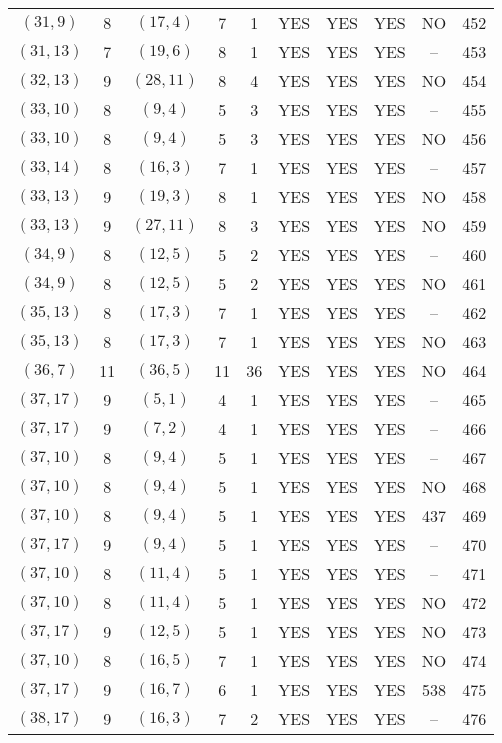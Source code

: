 \begin{longtable}{|c|c|c|c|c|c|c|c|c|c|}
$(31, 9)$ & 8 & $(17, 4)$ & 7 & 1 & YES & YES & YES & NO & 452\\
$(31, 13)$ & 7 & $(19, 6)$ & 8 & 1 & YES & YES & YES & -- & 453\\
$(32, 13)$ & 9 & $(28, 11)$ & 8 & 4 & YES & YES & YES & NO & 454\\
$(33, 10)$ & 8 & $(9, 4)$ & 5 & 3 & YES & YES & YES & -- & 455\\
$(33, 10)$ & 8 & $(9, 4)$ & 5 & 3 & YES & YES & YES & NO & 456\\
$(33, 14)$ & 8 & $(16, 3)$ & 7 & 1 & YES & YES & YES & -- & 457\\
$(33, 13)$ & 9 & $(19, 3)$ & 8 & 1 & YES & YES & YES & NO & 458\\
$(33, 13)$ & 9 & $(27, 11)$ & 8 & 3 & YES & YES & YES & NO & 459\\
$(34, 9)$ & 8 & $(12, 5)$ & 5 & 2 & YES & YES & YES & -- & 460\\
$(34, 9)$ & 8 & $(12, 5)$ & 5 & 2 & YES & YES & YES & NO & 461\\
$(35, 13)$ & 8 & $(17, 3)$ & 7 & 1 & YES & YES & YES & -- & 462\\
$(35, 13)$ & 8 & $(17, 3)$ & 7 & 1 & YES & YES & YES & NO & 463\\
$(36, 7)$ & 11 & $(36, 5)$ & 11 & 36 & YES & YES & YES & NO & 464\\
$(37, 17)$ & 9 & $(5, 1)$ & 4 & 1 & YES & YES & YES & -- & 465\\
$(37, 17)$ & 9 & $(7, 2)$ & 4 & 1 & YES & YES & YES & -- & 466\\
$(37, 10)$ & 8 & $(9, 4)$ & 5 & 1 & YES & YES & YES & -- & 467\\
$(37, 10)$ & 8 & $(9, 4)$ & 5 & 1 & YES & YES & YES & NO & 468\\
$(37, 10)$ & 8 & $(9, 4)$ & 5 & 1 & YES & YES & YES & 437 & 469\\
$(37, 17)$ & 9 & $(9, 4)$ & 5 & 1 & YES & YES & YES & -- & 470\\
$(37, 10)$ & 8 & $(11, 4)$ & 5 & 1 & YES & YES & YES & -- & 471\\
$(37, 10)$ & 8 & $(11, 4)$ & 5 & 1 & YES & YES & YES & NO & 472\\
$(37, 17)$ & 9 & $(12, 5)$ & 5 & 1 & YES & YES & YES & NO & 473\\
$(37, 10)$ & 8 & $(16, 5)$ & 7 & 1 & YES & YES & YES & NO & 474\\
$(37, 17)$ & 9 & $(16, 7)$ & 6 & 1 & YES & YES & YES & 538 & 475\\
$(38, 17)$ & 9 & $(16, 3)$ & 7 & 2 & YES & YES & YES & -- & 476\\

\end{longtable}
